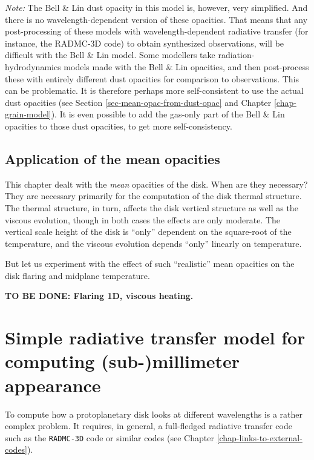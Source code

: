 \documentclass{book}
\newcommand{\code}[1]{{\small\tt #1}}
\begin{document}
{\em Note:} The Bell \& Lin dust opacity in this model is, however, very
simplified. And there is no wavelength-dependent version of these
opacities. That means that any post-processing of these models with
wavelength-dependent radiative transfer (for instance, the RADMC-3D code) to
obtain synthesized observations, will be difficult with the Bell \& Lin
model. Some modellers take radiation-hydrodynamics models made with the Bell \&
Lin opacities, and then post-process these with entirely different dust
opacities for comparison to observations. This can be problematic. It is
therefore perhaps more self-consistent to use the actual dust opacities (see
Section \ref{sec-mean-opac-from-dust-opac} and Chapter \ref{chap-grain-model}).
It is even possible to add the gas-only part of the Bell \& Lin opacities
to those dust opacities, to get more self-consistency.


\section{Application of the mean opacities}
%
This chapter dealt with the {\em mean} opacities of the disk. When are they
necessary? They are necessary primarily for the computation of the disk thermal
structure. The thermal structure, in turn, affects the disk vertical structure
as well as the viscous evolution, though in both cases the effects are only
moderate. The vertical scale height of the disk is ``only'' dependent on the
square-root of the temperature, and the viscous evolution depends ``only''
linearly on temperature.

But let us experiment with the effect of such ``realistic'' mean opacities
on the disk flaring and midplane temperature.






{\bf TO BE DONE: Flaring 1D, viscous heating.}







\chapter{Simple radiative transfer model for computing (sub-)millimeter appearance}
To compute how a protoplanetary disk looks at different wavelengths is a rather
complex problem. It requires, in general, a full-fledged radiative transfer code
such as the \code{RADMC-3D} code or similar codes (see Chapter
\ref{chap-links-to-external-codes}).
\end{document}
